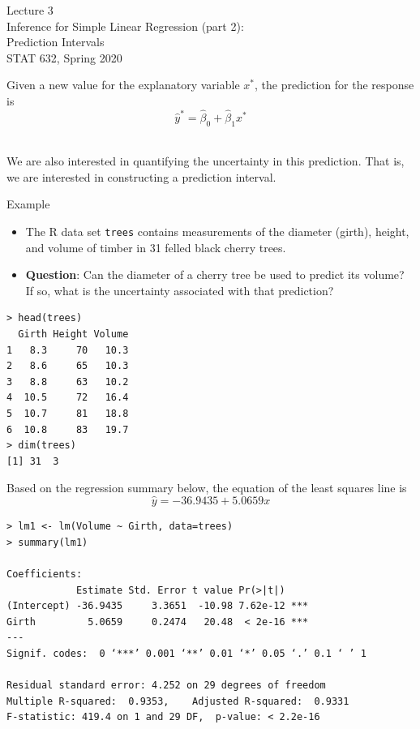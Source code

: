 \documentclass[10pt]{beamer}
\begin{document}
\begin{frame}
\large
Lecture 3\\
Inference for Simple Linear Regression (part 2):\\ 
Prediction Intervals\\
STAT 632, Spring 2020
\end{frame}

\begin{frame}
Given a new value for the explanatory variable $x^*$, the prediction for the response is 
$$\hat{y}^* = \hat{\beta}_0 + \hat{\beta}_1 x^* $$\\
\vspace{10pt}

We are also interested in quantifying the uncertainty in this prediction.  That is, we are interested in constructing a prediction interval.
\end{frame}

\begin{frame}[fragile]{Example}
\begin{itemize}
\item The R data set \texttt{trees} contains measurements of the diameter (girth), height, and volume of timber in 31 felled black cherry trees.\\
\vspace{5pt}
\item \textbf{Question}: Can the diameter of a cherry tree be used to predict its volume?  If so, what is the uncertainty associated with that prediction?
\end{itemize}

\small
\begin{verbatim}
> head(trees)
  Girth Height Volume
1   8.3     70   10.3
2   8.6     65   10.3
3   8.8     63   10.2
4  10.5     72   16.4
5  10.7     81   18.8
6  10.8     83   19.7
> dim(trees)
[1] 31  3
\end{verbatim}

\end{frame}

\begin{frame}[fragile]
Based on the regression summary below, the equation of the least squares line is\\
$$\hat{y} = -36.9435 + 5.0659x$$

\small
\begin{verbatim}
> lm1 <- lm(Volume ~ Girth, data=trees)
> summary(lm1)

Coefficients:
            Estimate Std. Error t value Pr(>|t|)    
(Intercept) -36.9435     3.3651  -10.98 7.62e-12 ***
Girth         5.0659     0.2474   20.48  < 2e-16 ***
---
Signif. codes:  0 ‘***’ 0.001 ‘**’ 0.01 ‘*’ 0.05 ‘.’ 0.1 ‘ ’ 1

Residual standard error: 4.252 on 29 degrees of freedom
Multiple R-squared:  0.9353,	Adjusted R-squared:  0.9331 
F-statistic: 419.4 on 1 and 29 DF,  p-value: < 2.2e-16
\end{verbatim}
\end{frame}
\end{document}
